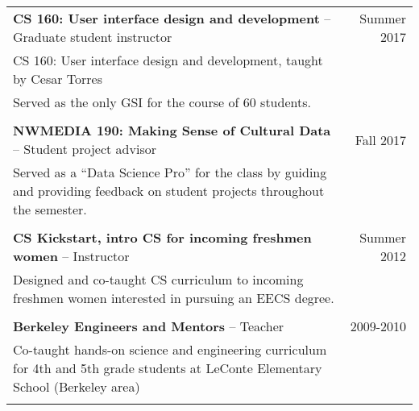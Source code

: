 \begin{longtable}{Xr}
	\textbf{CS 160: User interface design and development} -- Graduate student instructor & Summer 2017 \\
	CS 160: User interface design and development, taught by Cesar Torres &  \\
	Served as the only GSI for the course of 60 students. &  \\
	\\

	\textbf{NWMEDIA 190: Making Sense of Cultural Data} -- Student project advisor & Fall 2017 \\
	Served as a “Data Science Pro” for the class by guiding and providing feedback on student projects throughout the semester. &  \\
	\\

	\textbf{CS Kickstart, intro CS for incoming freshmen women} -- Instructor & Summer 2012 \\
	Designed and co-taught CS curriculum to incoming freshmen women interested in pursuing an EECS degree. &  \\
	\\

	\textbf{Berkeley Engineers and Mentors} -- Teacher & 2009-2010 \\
	Co-taught hands-on science and engineering curriculum for 4th and 5th grade students at LeConte Elementary School (Berkeley area) &  \\
	\\

\end{longtable}